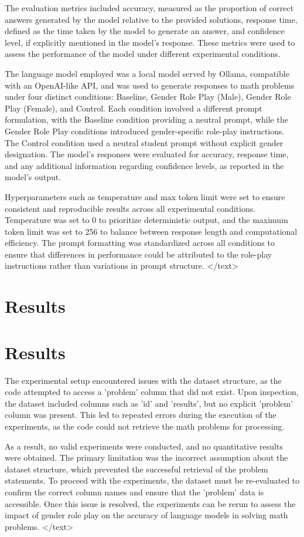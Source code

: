 \documentclass{article}
\begin{document}
The evaluation metrics included accuracy, measured as the proportion of correct answers generated by the model relative to the provided solutions, response time, defined as the time taken by the model to generate an answer, and confidence level, if explicitly mentioned in the model's response. These metrics were used to assess the performance of the model under different experimental conditions.

The language model employed was a local model served by Ollama, compatible with an OpenAI-like API, and was used to generate responses to math problems under four distinct conditions: Baseline, Gender Role Play (Male), Gender Role Play (Female), and Control. Each condition involved a different prompt formulation, with the Baseline condition providing a neutral prompt, while the Gender Role Play conditions introduced gender-specific role-play instructions. The Control condition used a neutral student prompt without explicit gender designation. The model's responses were evaluated for accuracy, response time, and any additional information regarding confidence levels, as reported in the model's output.

Hyperparameters such as temperature and max token limit were set to ensure consistent and reproducible results across all experimental conditions. Temperature was set to 0 to prioritize deterministic output, and the maximum token limit was set to 256 to balance between response length and computational efficiency. The prompt formatting was standardized across all conditions to ensure that differences in performance could be attributed to the role-play instructions rather than variations in prompt structure.
</text>
\section{Results}
\section{Results}

The experimental setup encountered issues with the dataset structure, as the code attempted to access a 'problem' column that did not exist. Upon inspection, the dataset included columns such as 'id' and 'results', but no explicit 'problem' column was present. This led to repeated errors during the execution of the experiments, as the code could not retrieve the math problems for processing. 

As a result, no valid experiments were conducted, and no quantitative results were obtained. The primary limitation was the incorrect assumption about the dataset structure, which prevented the successful retrieval of the problem statements. To proceed with the experiments, the dataset must be re-evaluated to confirm the correct column names and ensure that the 'problem' data is accessible. Once this issue is resolved, the experiments can be rerun to assess the impact of gender role play on the accuracy of language models in solving math problems.
</text>
\end{document}

